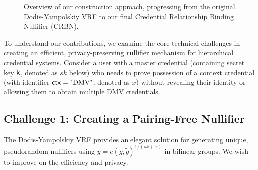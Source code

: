 \begin{figure}[ht]
\centering
{}
\caption{Overview of our construction approach, progressing from the original Dodis-Yampolskiy VRF to our final Credential Relationship Binding Nullifier (CRBN).}
\label{fig:vrf-construction-overview}
\end{figure}

To understand our contributions, we examine the core technical challenges in creating an efficient, privacy-preserving nullifier mechanism for hierarchical credential systems. Consider a user with a master credential (containing secret key $\mathsf{k}$, denoted as $sk$ below) who needs to prove possession of a context credential (with identifier $\mathsf{ctx} = \text{"DMV"}$, denoted as $x$) without revealing their identity or allowing them to obtain multiple DMV credentials.


\subsection{Challenge 1: Creating a Pairing-Free Nullifier}

The Dodis-Yampolskiy \cite{hutchison_verifiable_2005} VRF provides an elegant solution for generating unique, pseudorandom nullifiers using $y = e(g, \tilde{g})^{1/(sk+x)}$ in bilinear groups. We wish to improve on the efficiency and privacy. 

